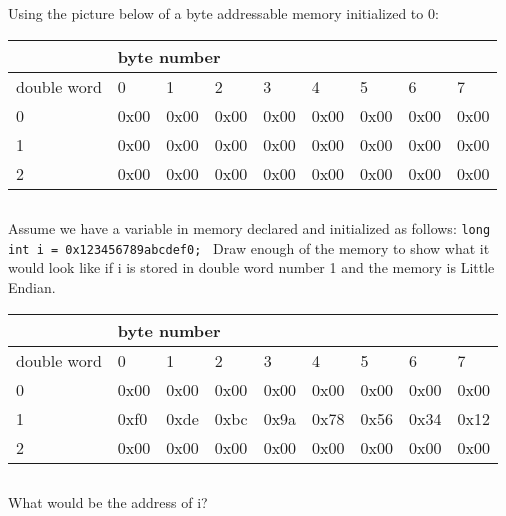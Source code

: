 \documentclass{article}
\begin{document}
\section{} 
Using the picture below of a byte addressable memory initialized to 0:
\vspace{5mm}

\begin{tabular}{|l|l|l|l|l|l|l|l|l|}
\hline
 & \multicolumn{8}{|l|}{byte number} \\ \hline
double word & 0 & 1 & 2 & 3 & 4 & 5 & 6 & 7 \\ \hline
0 & 0x00 & 0x00 & 0x00 & 0x00 & 0x00 & 0x00 & 0x00 & 0x00 \\ \hline
1 & 0x00 & 0x00 & 0x00 & 0x00 & 0x00 & 0x00 & 0x00 & 0x00 \\ \hline
2 & 0x00 & 0x00 & 0x00 & 0x00 & 0x00 & 0x00 & 0x00 & 0x00 \\ \hline
\end{tabular}
\vspace{10mm}

\pagebreak
\subsection{}
Assume we have a variable in memory declared and initialized as follows: 
\texttt{long int i = 0x123456789abcdef0; } 
Draw enough of the memory to show what it would look like if i is stored in double word number 1 and the memory is Little Endian.
\vspace{5mm}

\begin{tabular}{l|l|l|l|l|l|l|l|l|}
\cline{2-9}
 & \multicolumn{8}{|l|}{byte number} \\ \hline
\multicolumn{1}{|l|}{double word} & 0 & 1 & 2 & 3 & 4 & 5 & 6 & 7 \\ \hline
\multicolumn{1}{|l|}{0} & 0x00 & 0x00 & 0x00 & 0x00 & 0x00 & 0x00 & 0x00 & 0x00 \\ \hline
\multicolumn{1}{|l|}{1} & 0xf0 & 0xde & 0xbc & 0x9a & 0x78 & 0x56 & 0x34 & 0x12 \\ \hline
\multicolumn{1}{|l|}{2} & 0x00 & 0x00 & 0x00 & 0x00 & 0x00 & 0x00 & 0x00 & 0x00 \\ \hline
\end{tabular}
\subsection{}
What would be the address of i? 
\vspace{5mm}
\end{document}
